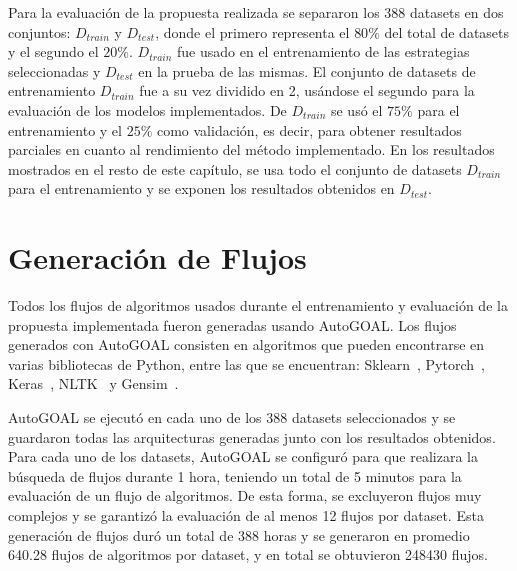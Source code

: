  
 Para la evaluación de la propuesta realizada se separaron los 388 datasets en dos conjuntos: $D_{train}$ y $D_{test}$, donde el primero representa el $80\%$ del total de datasets y el segundo el $20\%$. $D_{train}$ fue usado en el entrenamiento de las estrategias seleccionadas y $D_{test}$ en la prueba de las mismas. El conjunto de datasets de entrenamiento $D_{train}$ fue a su vez dividido en 2, usándose el segundo para la evaluación de los modelos implementados. De $D_{train}$ se usó el $75\%$ para el entrenamiento y el $25\%$ como validación, es decir, para obtener resultados parciales en cuanto al rendimiento del método implementado. En los resultados mostrados en el resto de este capítulo, se usa todo el conjunto de datasets $D_{train}$ para el entrenamiento y se exponen los resultados obtenidos en $D_{test}$.

 
 \section{Generación de Flujos}\label{sec:flujos}
 

Todos los flujos de algoritmos usados durante el entrenamiento y evaluación de la propuesta implementada fueron generadas usando AutoGOAL. Los flujos generados con AutoGOAL consisten en algoritmos que pueden encontrarse en varias bibliotecas de Python, entre las que se encuentran: Sklearn~\cite{scikit-learn}, Pytorch~\cite{paszke2019pytorch}, Keras~\cite{chollet2015keras}, NLTK~\cite{bird2009natural} y Gensim~\cite{khosrovian2008gensim}.

AutoGOAL se ejecutó en cada uno de los 388 datasets seleccionados y se guardaron todas las arquitecturas generadas junto con los resultados obtenidos. Para cada uno de los datasets, AutoGOAL se configuró para que realizara la búsqueda de flujos durante 1 hora, teniendo un total de 5 minutos para la evaluación de un flujo de algoritmos. De esta forma, se excluyeron flujos muy complejos y se garantizó la evaluación de al menos 12 flujos por dataset. Esta generación de flujos duró un total de 388 horas y se generaron en promedio 640.28 flujos de algoritmos por dataset, y en total se obtuvieron 248430  flujos. 

